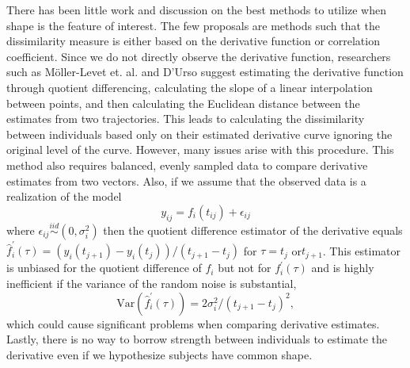 \documentclass[12pt]{article}
\begin{document}
There has been little work and discussion on the best methods to utilize when shape is the feature of interest. The few proposals are methods such that the dissimilarity measure is either based on the derivative function or correlation coefficient. Since we do not directly observe the derivative function, researchers such as M\"{o}ller-Levet et. al. \cite{moller2003} and D'Urso \cite{d2000} suggest estimating the derivative function through quotient differencing, calculating the slope of a linear interpolation between points, and then calculating the Euclidean distance between the estimates from two trajectories. This leads to calculating the dissimilarity between individuals based only on their estimated derivative curve ignoring the original level of the curve. However, many issues arise with this procedure. This method also requires balanced, evenly sampled data to compare derivative estimates from two vectors. Also, if we assume that the observed data is a realization of the model
$$y_{ij}= f_i(t_{ij})+\epsilon_{ij}$$
where $\epsilon_{ij}\overset{iid}{\sim} (0,\sigma_{i}^{2})$ then the quotient difference estimator of the derivative equals $\hat{f}_{i}^{'}(\tau) = (y_i(t_{j+1})-y_i(t_j))/(t_{j+1}-t_j)$ for $\tau= t_{j}$ or$ t_{j+1}$. This estimator is unbiased for the quotient difference of $f_{i}$ but not for $f_{i}^{'}(\tau)$ and is highly inefficient if the variance of the random noise is substantial,
$$\text{Var}(\hat{f}_{i}^{'}(\tau)) =  2\sigma^{2}_{i}/ (t_{j+1}-t_j)^{2},$$
which could cause significant problems when comparing derivative estimates. Lastly, there is no way to borrow strength between individuals to estimate the derivative even if we hypothesize subjects have common shape.  
\end{document}
